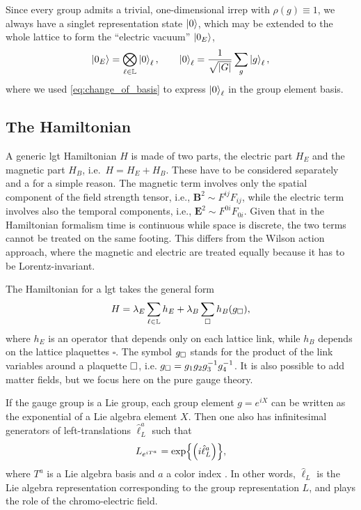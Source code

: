 \medskip

Since every group admits a trivial, one-dimensional \ac{irrep} with $\rho(g)\equiv 1$, we always have a singlet representation state $\ket{0}$, which may be extended to the whole lattice to form the ``electric vacuum'' $\ket{0_E}$,
\begin{equation}
    \ket{0_E} = \bigotimes_{\ell \in \mathbb{L}} \ket{0}_{\ell}, \qquad
    \ket{0}_{\ell} = \frac{1}{\sqrt{\abs{G}}} \sum_g \ket{g}_{\ell},
    \label{eq:electric ground state}
\end{equation}
where we used \eqref{eq:change_of_basis} to express $\ket{0}_{\ell}$ in the group element basis.


%
%
%
\subsection{The Hamiltonian}%
\label{sub:the_hamiltonian}

A generic \ac{lgt} Hamiltonian $H$ is made of two parts, the electric part $H_E$ and the magnetic part $H_B$, i.e.~$H = H_E + H_B$.
These have to be considered separately and a for a simple reason.
The magnetic term involves only the spatial component of the field strength tensor, i.e., $\mathbf{B}^{2} \sim F^{ij}F_{ij}$, while the electric term involves also the temporal components, i.e., $\mathbf{E}^2 \sim F^{0i} F_{0i}$.
Given that in the Hamiltonian formalism time is continuous while space is discrete, the two terms cannot be treated on the same footing.
This differs from the Wilson action approach, where the magnetic and electric are treated equally because it has to be Lorentz-invariant.

The Hamiltonian for a \ac{lgt} takes the general form \cite{kogut1975hamiltonian, zohar2015latticegauge}
\begin{equation}
    H = \lambda_E \sum_{\ell \in \mathbb{L}} h_E + \lambda_B \sum_{\square} h_B(g_\square),
    \label{eq:generic_hamiltonian}
\end{equation}
where $h_E$ is an operator that depends only on each lattice link, while $h_B$ depends on the lattice plaquettes $\square$.
The symbol $g_{\square}$ stands for the product of the link variables around a plaquette $\square$, i.e. $g_\square = g_1 g_2 g_3^{-1} g_4^{-1}$.
It is also possible to add matter fields, but we focus here on the pure gauge theory.

If the gauge group is a Lie group, each group element $g = e^{iX}$ can be written as the exponential of a Lie algebra element $X$.
Then one also has infinitesimal generators of left-translations $\hat{\ell}^a_L$ such that
\begin{equation*}
    L_{e^{iT^a}} = \exp{\pqty{i \hat{\ell}_L^a}},
\end{equation*}
where $T^a$ is a Lie algebra basis and $a$ a color index \cite{milstead2018qyangmills}.
In other words, $\hat{\ell}_L$ is the Lie algebra representation corresponding to the group representation $L$, and plays the role of the chromo-electric field.

